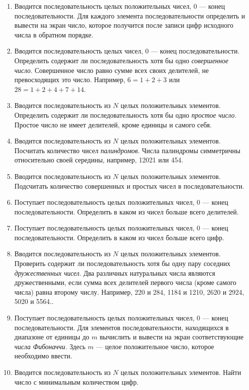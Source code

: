 \begin{enumerate}
\item Вводится последовательность целых положительных чисел, 0 --- конец последовательности. Для каждого элемента
последовательности определить и вывести на экран число, которое получится после записи цифр исходного числа в обратном
порядке.
\item Вводится последовательность целых чисел, 0 --- конец последовательности. Определить содержит ли последовательность
хотя бы одно\emph{ совершенное число}. Совершенное число равно сумме всех своих делителей, не
превосходящих это число. Например, $6=1+2+3$ или $28=1+2+4+7+14$.
\item Вводится последовательность из $N$ целых положительных элементов. Определить содержит ли последовательность хотя бы
одно \emph{простое число}. Простое число не имеет делителей, кроме единицы и самого себя.
\item Вводится последовательность из $N$ целых положительных элементов. Посчитать количество чисел
\emph{палиндромов}. Числа палиндромы симметричны относительно своей середины, например, 12021 или 454.
\item Вводится последовательность из $N$ целых положительных элементов. Подсчитать количество совершенных и простых чисел
в последовательности.
\item Поступает последовательность целых положительных чисел, 0 --- конец последовательности. Определить в каком из чисел
больше всего делителей.
\item Поступает последовательность целых положительных чисел, 0 --- конец последовательности. Определить в каком из чисел
больше всего цифр. 
\item Вводится последовательность из $N$ целых положительных элементов. Проверить содержит ли последовательность хотя бы
одну пару соседних \emph{дружественных чисел}. Два различных натуральных числа являются дружественными,
если сумма всех делителей первого числа (кроме самого числа) равна второму числу. Например, 220 и 284, 1184 и 1210,
2620 и 2924, 5020 и 5564..
\item Поступает последовательность целых положительных чисел, 0 --- конец последовательности. Для элементов
последовательности, находящихся в диапазоне от единицы до $m$ вычислить и вывести на экран
соответствующие \emph{числа Фибоначчи.} Здесь $m$ --- целое положительное число, которое
необходимо ввести.
\item Вводится последовательность из $N$ целых положительных элементов. Найти число с минимальным количеством цифр.

\end{enumerate}
